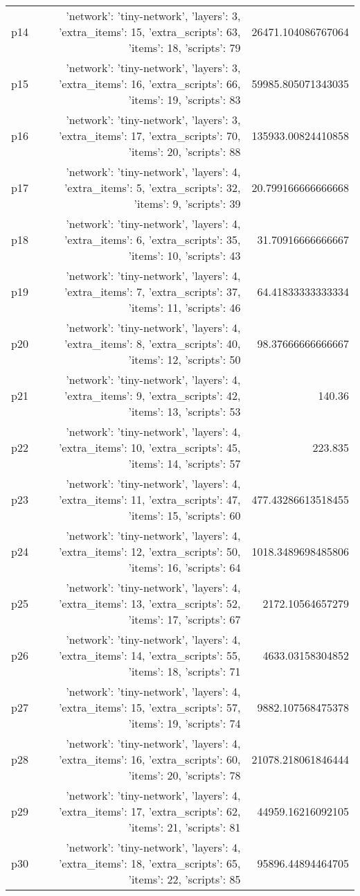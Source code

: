 \documentclass{article}
\begin{document}
\begin{center}
\begin{tabular}{r|r|r}
  p14&{'network': 'tiny-network', 'layers': 3, 'extra\_items': 15, 'extra\_scripts': 63, 'items': 18, 'scripts': 79}&26471.104086767064\\
  p15&{'network': 'tiny-network', 'layers': 3, 'extra\_items': 16, 'extra\_scripts': 66, 'items': 19, 'scripts': 83}&59985.805071343035\\
  p16&{'network': 'tiny-network', 'layers': 3, 'extra\_items': 17, 'extra\_scripts': 70, 'items': 20, 'scripts': 88}&135933.00824410858\\
  p17&{'network': 'tiny-network', 'layers': 4, 'extra\_items': 5, 'extra\_scripts': 32, 'items': 9, 'scripts': 39}&20.799166666666668\\
  p18&{'network': 'tiny-network', 'layers': 4, 'extra\_items': 6, 'extra\_scripts': 35, 'items': 10, 'scripts': 43}&31.70916666666667\\
  p19&{'network': 'tiny-network', 'layers': 4, 'extra\_items': 7, 'extra\_scripts': 37, 'items': 11, 'scripts': 46}&64.41833333333334\\
  p20&{'network': 'tiny-network', 'layers': 4, 'extra\_items': 8, 'extra\_scripts': 40, 'items': 12, 'scripts': 50}&98.37666666666667\\
  p21&{'network': 'tiny-network', 'layers': 4, 'extra\_items': 9, 'extra\_scripts': 42, 'items': 13, 'scripts': 53}&140.36\\
  p22&{'network': 'tiny-network', 'layers': 4, 'extra\_items': 10, 'extra\_scripts': 45, 'items': 14, 'scripts': 57}&223.835\\
  p23&{'network': 'tiny-network', 'layers': 4, 'extra\_items': 11, 'extra\_scripts': 47, 'items': 15, 'scripts': 60}&477.43286613518455\\
  p24&{'network': 'tiny-network', 'layers': 4, 'extra\_items': 12, 'extra\_scripts': 50, 'items': 16, 'scripts': 64}&1018.3489698485806\\
  p25&{'network': 'tiny-network', 'layers': 4, 'extra\_items': 13, 'extra\_scripts': 52, 'items': 17, 'scripts': 67}&2172.10564657279\\
  p26&{'network': 'tiny-network', 'layers': 4, 'extra\_items': 14, 'extra\_scripts': 55, 'items': 18, 'scripts': 71}&4633.03158304852\\
  p27&{'network': 'tiny-network', 'layers': 4, 'extra\_items': 15, 'extra\_scripts': 57, 'items': 19, 'scripts': 74}&9882.107568475378\\
  p28&{'network': 'tiny-network', 'layers': 4, 'extra\_items': 16, 'extra\_scripts': 60, 'items': 20, 'scripts': 78}&21078.218061846444\\
  p29&{'network': 'tiny-network', 'layers': 4, 'extra\_items': 17, 'extra\_scripts': 62, 'items': 21, 'scripts': 81}&44959.16216092105\\
  p30&{'network': 'tiny-network', 'layers': 4, 'extra\_items': 18, 'extra\_scripts': 65, 'items': 22, 'scripts': 85}&95896.44894464705
                            \end{tabular}
                            \end{center}
                    
\end{document}
